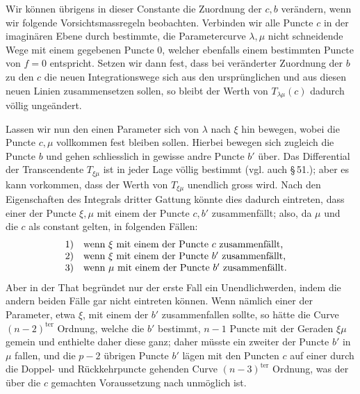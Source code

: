 \documentclass[10pt]{article}
\begin{document}
Wir können übrigens in dieser Constante die Zuordnung der \(c,b\) verändern, wenn wir folgende Vorsichtsmassregeln beobachten. Verbinden wir alle Puncte \(c\) in der imaginären Ebene durch bestimmte, die Parametercurve \(\lambda,\mu\) nicht schneidende Wege mit einem gegebenen Puncte \(0\), welcher ebenfalls einem bestimmten Puncte von \(f=0\) entspricht. Setzen wir dann fest, dass bei veränderter Zuordnung der \(b\) zu den \(c\) die neuen Integrationswege sich aus den ursprünglichen und aus diesen neuen Linien zusammensetzen sollen, so bleibt der Werth von \(T_{\lambda\mu}(c)\) dadurch völlig ungeändert.

Lassen wir nun den einen Parameter sich von \(\lambda\) nach \(\xi\) hin bewegen, wobei die Puncte \(c,\mu\) vollkommen fest bleiben sollen. Hierbei bewegen sich zugleich die Puncte \(b\) und gehen schliesslich in gewisse andre Puncte \(b'\) über. Das Differential der Transcendente \(T_{\xi\mu}\) ist in jeder Lage völlig bestimmt (vgl. auch \S\,51.); aber es kann vorkommen, dass der Werth von \(T_{\xi\mu}\) unendlich gross wird. Nach den Eigenschaften des Integrals dritter Gattung könnte dies dadurch eintreten, dass einer der Puncte \(\xi,\mu\) mit einem der Puncte \(c,b'\) zusammenfällt; also, da \(\mu\) und die \(c\) als constant gelten, in folgenden Fällen:
\[
\begin{array}{ll}
1) & \text{wenn }\xi\text{ mit einem der Puncte }c\text{ zusammenfällt,}\quad\hfill\\
2) & \text{wenn }\xi\text{ mit einem der Puncte }b'\text{ zusammenfällt,}\quad\hfill\\
3) & \text{wenn }\mu\text{ mit einem der Puncte }b'\text{ zusammenfällt.}
\end{array}
\]
Aber in der That begründet nur der erste Fall ein Unendlichwerden, indem die andern beiden Fälle gar nicht eintreten können. Wenn nämlich einer der Parameter, etwa \(\xi\), mit einem der \(b'\) zusammenfallen sollte, so hätte die Curve \((n-2)^{\mathrm{ter}}\) Ordnung, welche die \(b'\) bestimmt, \(n-1\) Puncte mit der Geraden \(\xi\mu\) gemein und enthielte daher diese ganz; daher müsste ein zweiter der Puncte \(b'\) in \(\mu\) fallen, und die \(p-2\) übrigen Puncte \(b'\) lägen mit den Puncten \(c\) auf einer durch die Doppel- und Rückkehrpuncte gehenden Curve \((n-3)^{\mathrm{ter}}\) Ordnung, was der über die \(c\) gemachten Voraussetzung nach unmöglich ist.
\end{document}
